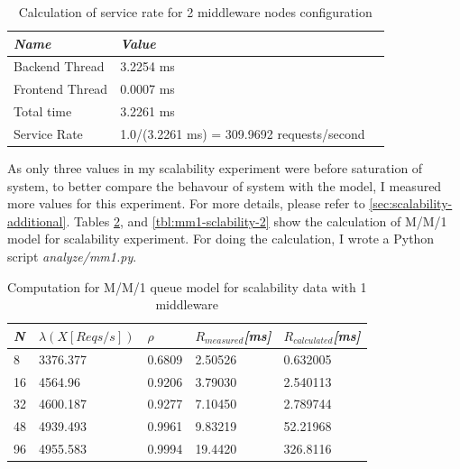 \documentclass[11pt]{article}
\begin{document}
\begin{table}[!ht]
  \begin{tabular}{*3l}    \toprule
    \emph{Name}   & \emph{Value} \\
    \hline
      Backend Thread     & 3.2254 ms \\
      Frontend Thread    & 0.0007 ms \\
      Total time         & 3.2261 ms \\
    \hline
      Service Rate       & 1.0/(3.2261 ms) = 309.9692 requests/second \\
    \hline
  \end{tabular}
  \centering
  \caption{Calculation of service rate for 2 middleware nodes configuration}
  \label{tbl:scalability2-sr}
\end{table}

As only three values in my scalability experiment were before saturation of system, to better compare the 
behavour of system with the model, I measured more values for this experiment. 
For more details, please refer to  \cref{sec:scalability-additional}.
Tables \ref{tbl:mm1-sclability-1}, and \ref{tbl:mm1-sclability-2} show the calculation of M/M/1 model for scalability 
experiment. For doing the calculation, I wrote a Python script \emph{analyze/mm1.py}.

\begin{table}[!ht]
  \begin{tabular}{*5l}    \toprule
  \emph{N} & \emph{$\lambda(X[Reqs/s])$} &  \emph{$\rho$}  &\emph{$R_{measured}$[ms]} & \emph{$R_{calculated}$[ms]}\\\midrule
8  & 3376.377 & 0.6809 &  2.50526 & 0.632005 \\
16 & 4564.96   & 0.9206 &  3.79030 & 2.540113 \\
32 & 4600.187  & 0.9277 &  7.10450 & 2.789744 \\
48 & 4939.493  & 0.9961 &  9.83219 & 52.21968 \\
96 & 4955.583  & 0.9994 & 19.4420 & 326.8116 \\
    \hline
  \end{tabular}
  \centering
  \caption{Computation for M/M/1 queue model for scalability data with 1 middleware}
  \label{tbl:mm1-sclability-1}
\end{table}
\end{document}
